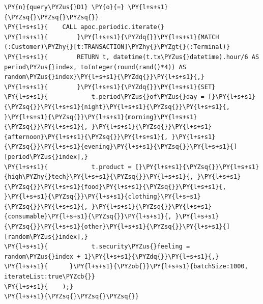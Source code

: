     \begin{tcolorbox}[breakable, size=fbox, boxrule=1pt, pad at break*=1mm,colback=cellbackground, colframe=cellborder]
\begin{Verbatim}[commandchars=\\\{\}]
\PY{n}{query\PYZus{}D1} \PY{o}{=} \PY{l+s+s1}{\PYZsq{}\PYZsq{}\PYZsq{}}
\PY{l+s+s1}{    CALL apoc.periodic.iterate(}
\PY{l+s+s1}{        }\PY{l+s+s1}{\PYZdq{}}\PY{l+s+s1}{MATCH (:Customer)\PYZhy{}[t:TRANSACTION]\PYZhy{}\PYZgt{}(:Terminal)}
\PY{l+s+s1}{        RETURN t, datetime(t.tx\PYZus{}datetime).hour/6 AS period\PYZus{}index, toInteger(round(rand()*4)) AS random\PYZus{}index}\PY{l+s+s1}{\PYZdq{}}\PY{l+s+s1}{,}
\PY{l+s+s1}{        }\PY{l+s+s1}{\PYZdq{}}\PY{l+s+s1}{SET}
\PY{l+s+s1}{            t.period\PYZus{}of\PYZus{}day = [}\PY{l+s+s1}{\PYZsq{}}\PY{l+s+s1}{night}\PY{l+s+s1}{\PYZsq{}}\PY{l+s+s1}{, }\PY{l+s+s1}{\PYZsq{}}\PY{l+s+s1}{morning}\PY{l+s+s1}{\PYZsq{}}\PY{l+s+s1}{, }\PY{l+s+s1}{\PYZsq{}}\PY{l+s+s1}{afternoon}\PY{l+s+s1}{\PYZsq{}}\PY{l+s+s1}{, }\PY{l+s+s1}{\PYZsq{}}\PY{l+s+s1}{evening}\PY{l+s+s1}{\PYZsq{}}\PY{l+s+s1}{][period\PYZus{}index],}
\PY{l+s+s1}{            t.product = [}\PY{l+s+s1}{\PYZsq{}}\PY{l+s+s1}{high\PYZhy{}tech}\PY{l+s+s1}{\PYZsq{}}\PY{l+s+s1}{, }\PY{l+s+s1}{\PYZsq{}}\PY{l+s+s1}{food}\PY{l+s+s1}{\PYZsq{}}\PY{l+s+s1}{, }\PY{l+s+s1}{\PYZsq{}}\PY{l+s+s1}{clothing}\PY{l+s+s1}{\PYZsq{}}\PY{l+s+s1}{, }\PY{l+s+s1}{\PYZsq{}}\PY{l+s+s1}{consumable}\PY{l+s+s1}{\PYZsq{}}\PY{l+s+s1}{, }\PY{l+s+s1}{\PYZsq{}}\PY{l+s+s1}{other}\PY{l+s+s1}{\PYZsq{}}\PY{l+s+s1}{][random\PYZus{}index],}
\PY{l+s+s1}{            t.security\PYZus{}feeling = random\PYZus{}index + 1}\PY{l+s+s1}{\PYZdq{}}\PY{l+s+s1}{,}
\PY{l+s+s1}{      }\PY{l+s+s1}{\PYZob{}}\PY{l+s+s1}{batchSize:1000, iterateList:true\PYZcb{}}
\PY{l+s+s1}{    );}
\PY{l+s+s1}{\PYZsq{}\PYZsq{}\PYZsq{}}
\end{Verbatim}
\end{tcolorbox}

